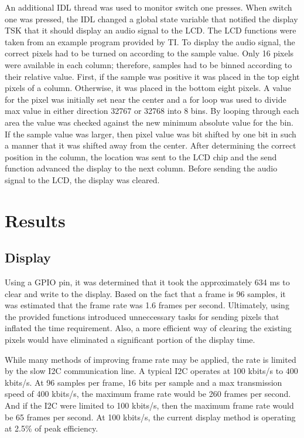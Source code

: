 \documentclass[11pt,pdftex,portrait,letterpaper]{article}
\begin{document}
An additional IDL thread was used to monitor switch one presses. When switch one was pressed, the IDL changed a global state variable that notified the display TSK that it should display an audio signal to the LCD. The LCD functions were taken from an example program provided by TI. To display the audio signal, the correct pixels had to be turned on according to the sample value. Only 16 pixels were available in each column; therefore, samples had to be binned according to their relative value. First, if the sample was positive it was placed in the top eight pixels of a column. Otherwise, it was placed in the bottom eight pixels. A value for the pixel was initially set near the center and a for loop was used to divide max value in either direction 32767 or 32768 into 8 bins. By looping through each area the value was checked against the new minimum absolute value for the bin. If the sample value was larger, then pixel value was bit shifted by one bit in such a manner that it was shifted away from the center. After determining the correct position in the column, the location was sent to the LCD chip and the send function advanced the display to the next column. Before sending the audio signal to the LCD, the display was cleared.

\section{Results}

\subsection{Display}

Using a GPIO pin, it was determined that it took the approximately 634 ms to clear and write to the display. Based on the fact that a frame is 96 samples, it was estimated that the frame rate was 1.6 frames per second. Ultimately, using the provided functions  introduced unneccessary tasks for sending pixels that inflated the time requirement. Also, a more efficient way of clearing the existing pixels would have eliminated a significant portion of the display time.

While many methods of improving frame rate may be applied, the rate is limited by the slow I2C communication line. A typical I2C operates at 100 kbits/s to 400 kbits/s. At 96 samples per frame, 16 bits per sample and a max transmission speed of 400 kbits/s, the maximum frame rate would be 260 frames per second. And if the I2C were limited to 100 kbits/s, then the maximum frame rate would be 65 frames per second. At 100 kbits/s, the current display method is operating at 2.5\% of peak efficiency. 
\end{document}
